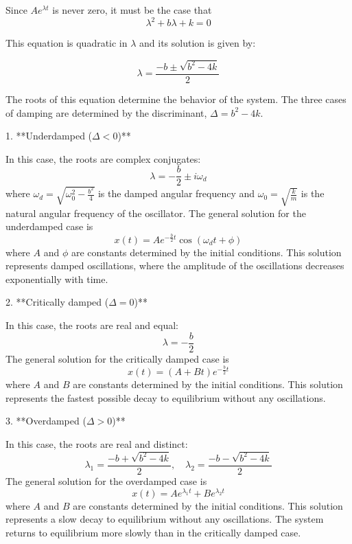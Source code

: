\documentclass{article}
\begin{document}
Since $Ae^{\lambda t}$ is never zero, it must be the case that
\begin{equation*}
\lambda^2 + b \lambda + k = 0
\end{equation*}

This equation is quadratic in $\lambda$ and its solution is given by:

\begin{equation*}
\lambda = \frac{-b \pm \sqrt{b^2 - 4k}}{2}
\end{equation*}

The roots of this equation determine the behavior of the system. The three cases of damping are determined by the discriminant, $\Delta = b^2 - 4k$.

1. **Underdamped ($\Delta < 0$)**

In this case, the roots are complex conjugates:
\begin{equation*}
\lambda = -\frac{b}{2} \pm i \omega_d
\end{equation*}
where $\omega_d = \sqrt{\omega_0^2 - \frac{b^2}{4}}$ is the damped angular frequency and $\omega_0 = \sqrt{\frac{k}{m}}$ is the natural angular frequency of the oscillator. The general solution for the underdamped case is
\begin{equation*}
x(t) = Ae^{-\frac{b}{2}t} \cos(\omega_d t + \phi)
\end{equation*}
where $A$ and $\phi$ are constants determined by the initial conditions. This solution represents damped oscillations, where the amplitude of the oscillations decreases exponentially with time.

2. **Critically damped ($\Delta = 0$)**

In this case, the roots are real and equal:
\begin{equation*}
\lambda = -\frac{b}{2}
\end{equation*}
The general solution for the critically damped case is
\begin{equation*}
x(t) = (A + Bt)e^{-\frac{b}{2}t}
\end{equation*}
where $A$ and $B$ are constants determined by the initial conditions. This solution represents the fastest possible decay to equilibrium without any oscillations.

3. **Overdamped ($\Delta > 0$)**

In this case, the roots are real and distinct:
\begin{equation*}
\lambda_1 = \frac{-b + \sqrt{b^2 - 4k}}{2}, \quad \lambda_2 = \frac{-b - \sqrt{b^2 - 4k}}{2}
\end{equation*}
The general solution for the overdamped case is
\begin{equation*}
x(t) = Ae^{\lambda_1 t} + Be^{\lambda_2 t}
\end{equation*}
where $A$ and $B$ are constants determined by the initial conditions. This solution represents a slow decay to equilibrium without any oscillations. The system returns to equilibrium more slowly than in the critically damped case.
\end{document}
